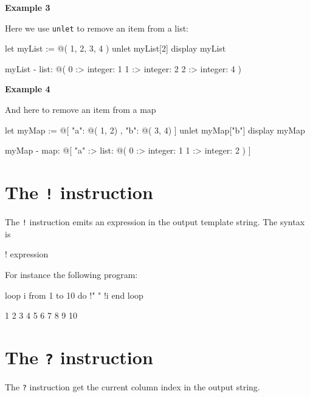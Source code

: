 \documentclass[10pt,openright,twosides]{report}
\newcommand{\gtlinline}[1]{\colorbox{light-blue}{\lstinline[language=gtl]{#1}}}
\newcommand{\examplen}[1]{\vspace{.75em}\noindent\textbf{Example #1}\vspace{0em}}
\begin{document}
\examplen{3}

\noindent Here we use \gtlinline{unlet} to remove an item from a list:

\begin{gtl}
let myList := @( 1, 2, 3, 4 )
unlet myList[2]
display myList
\end{gtl}

\begin{console}
myList - list: @(
    0 :>
        integer: 1
    1 :>
        integer: 2
    2 :>
        integer: 4
)
\end{console}

\examplen{4}

\noindent And here to remove an item from a map

\begin{gtl}
let myMap := @[ "a": @( 1, 2) , "b": @( 3, 4) ]
unlet myMap["b"]
display myMap
\end{gtl}

\begin{console}
myMap - map: @[
    "a" :>
        list: @(
            0 :>
                integer: 1
            1 :>
                integer: 2
        )
]

\end{console}

\section{The \texttt{!} instruction}

The \gtlinline{!} instruction emits an expression in the output template string. The syntax is

\begin{gtl}
! expression
\end{gtl}

\noindent For instance the following program:

\begin{gtl}
loop i from 1 to 10 do
  !" " !i
end loop
\end{gtl}

\begin{templateoutput}
 1 2 3 4 5 6 7 8 9 10
\end{templateoutput}

\section{The \texttt{?} instruction}

The \gtlinline{?} instruction get the current column index in the output string.
\end{document}
